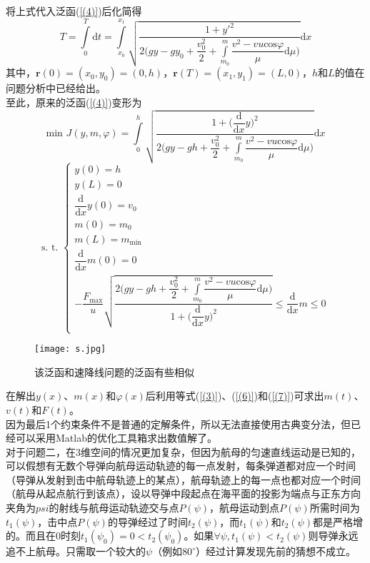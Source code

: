 \documentclass[UTF8]{article}
\begin{document}
\indent 将上式代入泛函(\ref{(4)})后化简得
\[T=\int\limits_0^T\textrm{d}t=\int\limits_{x_0}^{x_1}\sqrt{\dfrac{1+y'^2}{2\Big(gy-gy_0+\dfrac{v_0^2}{2}+\int\limits_{m_0}^m\dfrac{v^2-vu\textrm{cos}\varphi}{\mu}\textrm{d}\mu\Big)}}\textrm{d}x\]
\indent 其中，\(\textbf{r}(0)=(x_0,y_0)=(0,h)\)，\(\textbf{r}(T)=(x_1,y_1)=(L,0)\)，\(h\)和\(L\)的值在问题分析中已经给出。\\
\indent 至此，原来的泛函(\ref{(4)})变形为
\[\textrm{min }J(y,m,\varphi)=\int\limits_{0}^{h}\sqrt{\dfrac{1+\Big(\dfrac{\textrm{d}}{\textrm{d}x}y\Big)^2}{2\Big(gy-gh+\dfrac{v_0^2}{2}+\int\limits_{m_0}^m\dfrac{v^2-vu\textrm{cos}\varphi}{\mu}\textrm{d}\mu\Big)}}\textrm{d}x\]
\[\textrm{s. t. }\left\{
\begin{array}{l}
y(0)=h\\
y(L)=0\\
\dfrac{\textrm{d}}{\textrm{d}x}y(0)=v_0\\
m(0)=m_0\\
m(L)=m_\textrm{min}\\
\dfrac{\textrm{d}}{\textrm{d}x}m(0)=0\\
-\dfrac{F_\textrm{max}}{u}\sqrt{\dfrac{2\Big(gy-gh+\dfrac{v_0^2}{2}+\int\limits_{m_0}^m\dfrac{v^2-vu\textrm{cos}\varphi}{\mu}\textrm{d}\mu\Big)}{1+\Big(\dfrac{\textrm{d}}{\textrm{d}x}y\Big)^2}}\leqslant\dfrac{\textrm{d}}{\textrm{d}x}m\leqslant0\\
\end{array}\right. \]
\begin{figure}[htbp]
\small
\centering
\texttt{[image: s.jpg]}
\caption{该泛函和速降线问题的泛函有些相似}
\end{figure}
\indent 在解出\(y(x)\)、\(m(x)\)和\(\varphi(x)\)后利用等式(\ref{(3)})、(\ref{(6)})和(\ref{(7)})可求出\(m(t)\)、\(v(t)\)和\(F(t)\)。\\
\indent 因为最后1个约束条件不是普通的定解条件，所以无法直接使用古典变分法，但已经可以采用Matlab的优化工具箱求出数值解了。\\
\indent 对于问题二，在3维空间的情况更加复杂，但因为航母的匀速直线运动是已知的，可以假想有无数个导弹向航母运动轨迹的每一点发射，每条弹道都对应一个时间（导弹从发射到击中航母轨迹上的某点），航母轨迹上的每一点也都对应一个时间（航母从起点航行到该点），设以导弹中段起点在海平面的投影为端点与正东方向夹角为\(psi\)的射线与航母运动轨迹交与点\(P(\psi)\)，航母运动到点\(P(\psi)\)所需时间为\(t_1(\psi)\)，击中点\(P(\psi)\)的导弹经过了时间\(t_2(\psi)\)，而\(t_1(\psi)\)和\(t_2(\psi)\)都是严格增的。而且在0时刻\(t_1(\psi_0)=0<t_2(\psi_0)\)。如果\(\forall\psi,t_1(\psi)<t_2(\psi)\)则导弹永远追不上航母。只需取一个较大的\(\psi\)（例如\(80^\circ\)）经过计算发现先前的猜想不成立。\\
\end{document}
